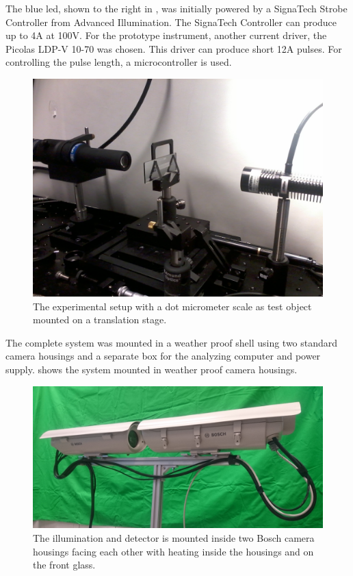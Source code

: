 The blue \gls{led}, shown to the right in , was initially powered by a SignaTech Strobe Controller from Advanced Illumination. The SignaTech Controller can produce up to 4A at 100V. For the prototype instrument, another current driver, the Picolas LDP-V 10-70 was chosen. This driver can produce short 12A pulses. For controlling the pulse length, a microcontroller is used. 

\begin{figure}[ht]
\centering\includegraphics[width=0.75\linewidth]{figures/Foto0169}
\caption{The experimental setup with a dot micrometer scale as test object mounted on a translation stage.}
\label{fig:experimental}
\end{figure}

The complete system was mounted in a weather proof shell using two standard camera housings and a separate box for the analyzing computer and power supply.  shows the system mounted in weather proof camera housings. 

\begin{figure}[ht]
\centering\includegraphics[width=0.75\linewidth]{figures/cam_housings}
\caption{The illumination and detector is mounted inside two Bosch camera housings facing each other with heating inside the housings and on the front glass.}
\label{fig:housings}
\end{figure}

